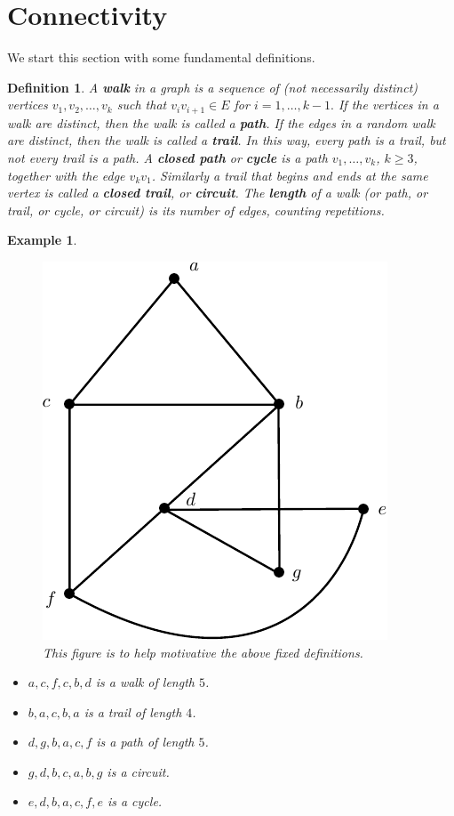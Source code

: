 \documentclass[12pt,a4paper]{article}
\newtheorem{defn}{Definition}[section]
\newtheorem{exmp}{Example}[section]
\theoremstyle{definition}
\begin{document}
\section{Connectivity}
We start this section with some fundamental definitions.
\begin{defn} A \textbf{walk} in a graph is a sequence of (not necessarily distinct) vertices $v_1, v_2, \dots , v_k$ such that $v_iv_{i+1} \in E$ for $i=1, \dots , k-1.$  If the vertices in a walk are distinct, then the walk is called a \textbf{path}. If the edges in a random walk are distinct, then the walk is called a \textbf{trail}. In this way, every path is a trail, but not every trail is a path. A \textbf{closed path} or \textbf{cycle} is a path $v_1, \dots ,  v_k$, $k \geq 3$, together with the edge $v_kv_1$. Similarly a trail that begins and ends at the same vertex is called a \textbf{closed trail}, or \textbf{circuit}. The \textbf{length} of a walk (or path, or trail, or cycle, or circuit) is its number of edges, counting repetitions. 
\end{defn}
\begin{exmp} \
\begin{figure}[hbtp]
\centering
\includegraphics[scale=1]{images/graph19.pdf}
\caption{This figure is to help motivative the above fixed definitions.}
\end{figure}
\begin{itemize}
\item $a,c,f,c,b,d$ is  a walk of length $5$.
\item $b,a,c,b,a$ is a trail of length $4$.
\item $d,g,b,a,c,f$ is a path of length $5$.
\item $g,d,b,c,a,b,g$ is a circuit.
\item $e,d,b,a,c,f,e$ is a cycle.
\end{itemize}
\end{exmp}
\end{document}
